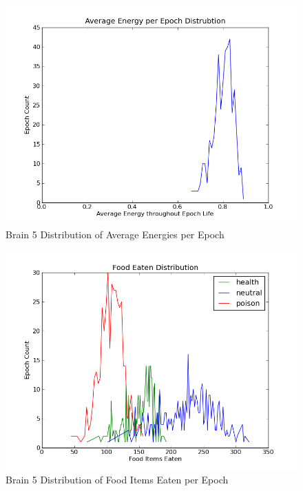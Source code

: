 \documentclass[a4paper,11pt]{article}
\begin{document}
\begin{figure}
\begin{center}
  \includegraphics[scale=1.0]{img/brain5/avgenergyGauss-0.07.png}
  \caption{Brain 5 Distribution of Average Energies per Epoch}
  \label{fig:b5avgenergy}
\end{center}
\end{figure}

\begin{figure}
\begin{center}
  \includegraphics[scale=1.0]{img/brain5/foodGauss-h27.29-n52.8-p31.64.png}
  \caption{Brain 5 Distribution of Food Items Eaten per Epoch}
  \label{fig:b5food}
\end{center}
\end{figure}
\end{document}
